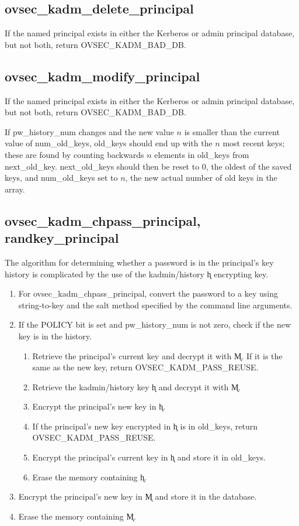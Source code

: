 \subsection{ovsec_kadm_delete_principal}

If the named principal exists in either the Kerberos or admin
principal database, but not both, return OVSEC_KADM_BAD_DB.

\subsection{ovsec_kadm_modify_principal}

If the named principal exists in either the Kerberos or admin
principal database, but not both, return OVSEC_KADM_BAD_DB.

If pw_history_num changes and the new value $n$ is smaller than the
current value of num_old_keys, old_keys should end up with the $n$
most recent keys; these are found by counting backwards $n$ elements
in old_keys from next_old_key.  next_old_keys should then be reset to
0, the oldest of the saved keys, and num_old_keys set to $n$, the
new actual number of old keys in the array.  

\subsection{ovsec_kadm_chpass_principal, randkey_principal}

The algorithm for determining whether a password is in the principal's
key history is complicated by the use of the kadmin/history \k{h}
encrypting key.  

\begin{enumerate}
\item For ovsec_kadm_chpass_principal, convert the password to a key
using string-to-key and the salt method specified by the command line
arguments.

\item If the POLICY bit is set and pw_history_num is not zero, check
if the new key is in the history.
\begin{enumerate}
\item Retrieve the principal's current key and decrypt it with \k{M}.
If it is the same as the new key, return OVSEC_KADM_PASS_REUSE.
\item Retrieve the kadmin/history key \k{h} and decrypt it with \k{M}.
\item Encrypt the principal's new key in \k{h}.
\item If the principal's new key encrypted in \k{h} is in old_keys,
return OVSEC_KADM_PASS_REUSE.
\item Encrypt the principal's current key in \k{h} and store it in
old_keys.
\item Erase the memory containing \k{h}.
\end{enumerate}

\item Encrypt the principal's new key in \k{M} and store it in the
database.
\item Erase the memory containing \k{M}.
\end{enumerate}

